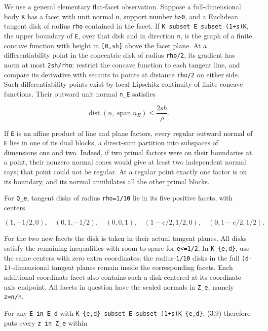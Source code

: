 \documentclass[
  11pt,
]{article}
\begin{document}
We use a general elementary flat-facet observation. Suppose a
full-dimensional body \texttt{K} has a facet with unit normal
\texttt{n}, support number \texttt{h\textgreater{}0}, and a Euclidean
tangent disk of radius \texttt{rho} contained in the facet. If
\texttt{K\ subset\ E\ subset\ (1+s)K}, the upper boundary of \texttt{E},
over that disk and in direction \texttt{n}, is the graph of a finite
concave function with height in \texttt{{[}0,sh{]}} above the facet
plane. At a differentiability point in the concentric disk of radius
\texttt{rho/2}, its gradient has norm at most \texttt{2sh/rho}: restrict
the concave function to each tangent line, and compare its derivative
with secants to points at distance \texttt{rho/2} on either side. Such
differentiability points exist by local Lipschitz continuity of finite
concave functions. Their outward unit normal \texttt{n\_E} satisfies

\[
 \operatorname{dist}(n,\operatorname{span}n_E)
       \le\frac{2sh}{\rho}. \tag{3.9}
\]

If \texttt{E} is an affine product of line and plane factors, every
regular outward normal of \texttt{E} lies in one of its dual blocks, a
direct-sum partition into subspaces of dimensions one and two. Indeed,
if two primal factors were on their boundaries at a point, their nonzero
normal cones would give at least two independent normal rays; that point
could not be regular. At a regular point exactly one factor is on its
boundary, and its normal annihilates all the other primal blocks.

For \texttt{Q\_e}, tangent disks of radius \texttt{rho=1/10} lie in its
five positive facets, with centers

\[
 (1,-1/2,0),\quad(0,1,-1/2),\quad(0,0,1),\quad
 (1-e/2,1/2,0),\quad(0,1-e/2,1/2).
\]

For the two new facets the disk is taken in their actual tangent planes.
All disks satisfy the remaining inequalities with room to spare for
\texttt{e\textless{}=1/2}. In \texttt{K\_\{e,d\}}, use the same centers
with zero extra coordinates; the radius-\texttt{1/10} disks in the full
\texttt{(d-1)}-dimensional tangent planes remain inside the
corresponding facets. Each additional coordinate facet also contains
such a disk centered at its coordinate-axis endpoint. All facets in
question have the scaled normals in \texttt{Z\_e}, namely
\texttt{z=n/h}.

For any \texttt{E\ in\ E\_d} with
\texttt{K\_\{e,d\}\ subset\ E\ subset\ (1+s)K\_\{e,d\}}, (3.9) therefore
puts every \texttt{z\ in\ Z\_e} within
\end{document}
